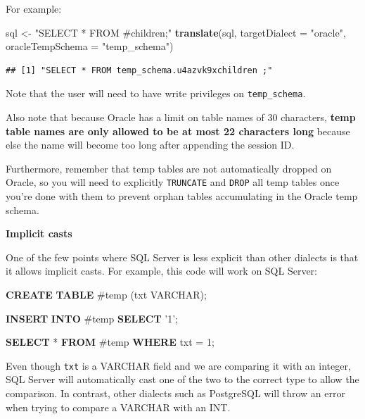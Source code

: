 \documentclass[11pt]{book}
\newenvironment{Shaded}{\begin{snugshade}}{\end{snugshade}}
\newcommand{\KeywordTok}[1]{\textcolor[rgb]{0.13,0.29,0.53}{\textbf{#1}}}
\newcommand{\DataTypeTok}[1]{\textcolor[rgb]{0.13,0.29,0.53}{#1}}
\newcommand{\DecValTok}[1]{\textcolor[rgb]{0.00,0.00,0.81}{#1}}
\newcommand{\StringTok}[1]{\textcolor[rgb]{0.31,0.60,0.02}{#1}}
\newcommand{\NormalTok}[1]{#1}
\begin{document}
For example:

\begin{Shaded}
\begin{Highlighting}[]
\NormalTok{sql <-}\StringTok{ "SELECT * FROM #children;"}
\KeywordTok{translate}\NormalTok{(sql, }\DataTypeTok{targetDialect =} \StringTok{"oracle"}\NormalTok{, }\DataTypeTok{oracleTempSchema =} \StringTok{"temp_schema"}\NormalTok{)}
\end{Highlighting}
\end{Shaded}

\begin{verbatim}
## [1] "SELECT * FROM temp_schema.u4azvk9xchildren ;"
\end{verbatim}

Note that the user will need to have write privileges on
\texttt{temp\_schema}.

Also note that because Oracle has a limit on table names of 30
characters, \textbf{temp table names are only allowed to be at most 22
characters long} because else the name will become too long after
appending the session ID.

Furthermore, remember that temp tables are not automatically dropped on
Oracle, so you will need to explicitly \texttt{TRUNCATE} and
\texttt{DROP} all temp tables once you're done with them to prevent
orphan tables accumulating in the Oracle temp schema.

\textbf{Implicit casts}

One of the few points where SQL Server is less explicit than other
dialects is that it allows implicit casts. For example, this code will
work on SQL Server:

\begin{Shaded}
\begin{Highlighting}[]
\KeywordTok{CREATE} \KeywordTok{TABLE}\NormalTok{ #temp (txt }\DataTypeTok{VARCHAR}\NormalTok{);}

\KeywordTok{INSERT} \KeywordTok{INTO}\NormalTok{ #temp}
\KeywordTok{SELECT} \StringTok{'1'}\NormalTok{;}

\KeywordTok{SELECT}\NormalTok{ * }\KeywordTok{FROM}\NormalTok{ #temp }\KeywordTok{WHERE}\NormalTok{ txt = }\DecValTok{1}\NormalTok{;}
\end{Highlighting}
\end{Shaded}

Even though \texttt{txt} is a VARCHAR field and we are comparing it with
an integer, SQL Server will automatically cast one of the two to the
correct type to allow the comparison. In contrast, other dialects such
as PostgreSQL will throw an error when trying to compare a VARCHAR with
an INT.
\end{document}
